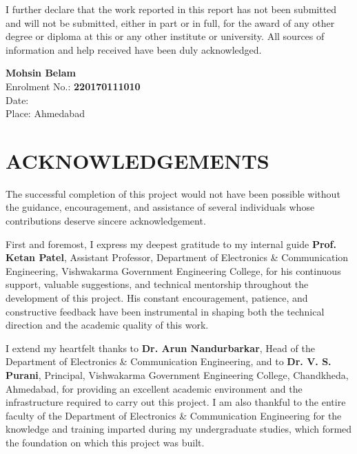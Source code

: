 \documentclass[12pt,a4paper,oneside]{report}
\begin{document}
I further declare that the work reported in this report has not been submitted
and will not be submitted, either in part or in full, for the award of any
other degree or diploma at this or any other institute or university. All
sources of information and help received have been duly acknowledged.

\vspace{3cm}

\begin{flushright}
\textbf{Mohsin Belam}\\
Enrolment No.: \textbf{220170111010}\\
Date: \underline{\hspace{3cm}}\\
Place: Ahmedabad
\end{flushright}

\chapter*{ACKNOWLEDGEMENTS}
\thispagestyle{romanplain}

The successful completion of this project would not have been possible
without the guidance, encouragement, and assistance of several individuals
whose contributions deserve sincere acknowledgement.

First and foremost, I express my deepest gratitude to my internal guide
\textbf{Prof. Ketan Patel}, Assistant Professor, Department of Electronics
\& Communication Engineering, Vishwakarma Government Engineering College,
for his continuous support, valuable suggestions, and technical mentorship
throughout the development of this project. His constant encouragement,
patience, and constructive feedback have been instrumental in shaping
both the technical direction and the academic quality of this work.

I extend my heartfelt thanks to \textbf{Dr. Arun Nandurbarkar}, Head of the
Department of Electronics \& Communication Engineering, and to
\textbf{Dr. V. S. Purani}, Principal, Vishwakarma Government Engineering
College, Chandkheda, Ahmedabad, for providing an excellent academic
environment and the infrastructure required to carry out this project. I am
also thankful to the entire faculty of the Department of Electronics \&
Communication Engineering for the knowledge and training imparted during
my undergraduate studies, which formed the foundation on which this
project was built.
\end{document}
